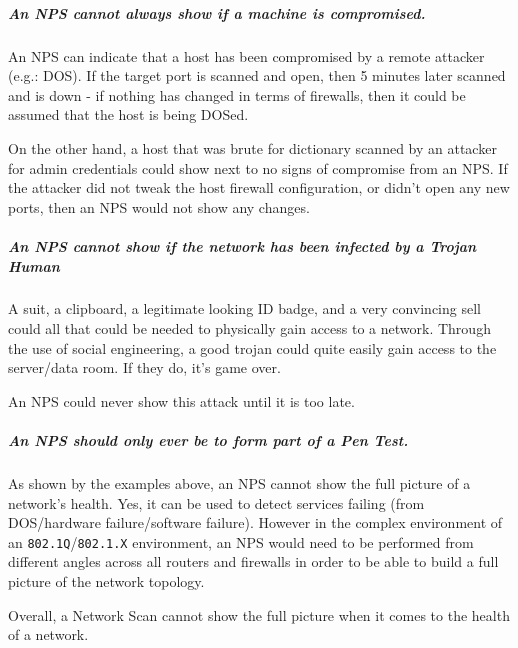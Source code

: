 \documentclass[a4paper]{article}
\begin{document}
\subparagraph{An NPS cannot always show if a machine is compromised.}
An NPS can indicate that a host has been compromised by a remote attacker (e.g.: DOS).
If the target port is scanned and open, then 5 minutes later scanned and is down - if nothing has changed in terms of firewalls, then it could be assumed that the host is being DOSed.

On the other hand, a host that was brute for dictionary scanned by an attacker for admin credentials could show next to no signs of compromise from an NPS.
If the attacker did not tweak the host firewall configuration, or didn't open any new ports, then an NPS would not show any changes.

\subparagraph{An NPS cannot show if the network has been infected by a Trojan Human}
A suit, a clipboard, a legitimate looking ID badge, and a very convincing sell could all that could be needed to physically gain access to a network.
Through the use of social engineering, a good trojan could quite easily gain access to the server/data room.
If they do, it's game over.

An NPS could never show this attack until it is too late.


\subparagraph{An NPS should only ever be to form part of a Pen Test.}
As shown by the examples above, an NPS cannot show the full picture of a network's health.
Yes, it can be used to detect services failing (from DOS/hardware failure/software failure).
However in the complex environment of an \texttt{802.1Q}/\texttt{802.1.X} environment, an NPS would need to be performed from different angles across all routers and firewalls in order to be able to build a full picture of the network topology.

Overall, a Network Scan cannot show the full picture when it comes to the health of a network.

\newpage
\printbibliography
\end{document}
